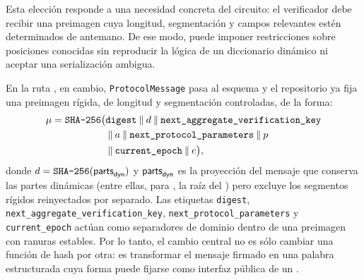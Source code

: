 Esta elección responde a una necesidad concreta del circuito: el verificador debe recibir una preimagen cuya longitud, segmentación y campos relevantes estén determinados de antemano. De ese modo, puede imponer restricciones sobre posiciones conocidas sin reproducir la lógica de un diccionario dinámico ni aceptar una serialización ambigua.

En la ruta \Lagrange, en cambio, \texttt{ProtocolMessage} pasa al esquema \RigidHashScheme y el repositorio ya fija una preimagen rígida, de longitud y segmentación controladas, de la forma:
$$
\begin{aligned}
\mu = \texttt{SHA-256} \bigl(&\texttt{digest} \mathbin{\|} d \mathbin{\|} \texttt{next\_aggregate\_verification\_key} \\
&\mathbin{\|} a \mathbin{\|} \texttt{next\_protocol\_parameters} \mathbin{\|} p \\
&\mathbin{\|} \texttt{current\_epoch} \mathbin{\|} e \bigr),
\end{aligned}
$$
donde $d = \texttt{SHA-256}(\mathsf{parts}_{\mathsf{dyn}})$ y \(\mathsf{parts}_{\mathsf{dyn}}\) es la proyección del mensaje que conserva las partes dinámicas (entre ellas, para \CardanoTransactions, la raíz del \Snapshot) pero excluye los segmentos rígidos reinyectados por separado. Las etiquetas \texttt{digest}, \texttt{next\_aggregate\_verification\_key}, \texttt{next\_protocol\_parameters} y \texttt{current\_epoch} actúan como separadores de dominio dentro de una preimagen con ranuras estables. Por lo tanto, el cambio central no es sólo cambiar una función de hash por otra: es transformar el mensaje firmado en una palabra estructurada cuya forma puede fijarse como interfaz pública de un \SNARK \cite{MithrilSTMRepo}.

